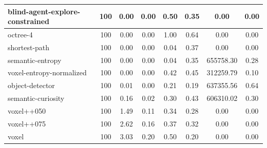 \begin{table}
\begin{longtable}{|l|c|c| c|c| c|c|c|}
        blind-agent-explore-constrained & 100 & {\cellcolor[HTML]{EBF2F0}} \color[HTML]{000000} 0.00 & {\cellcolor[HTML]{EBF2F0}} \color[HTML]{000000} 0.00 & {\cellcolor[HTML]{ACD4CC}} \color[HTML]{000000} 0.50 & 0.35 & 0.00 & 0.00 \\ \hline
        octree-4 & 100 & {\cellcolor[HTML]{EBF2F0}} \color[HTML]{000000} 0.00 & {\cellcolor[HTML]{EBF2F0}} \color[HTML]{000000} 0.00 & {\cellcolor[HTML]{55AA99}} \color[HTML]{F1F1F1} 1.00 & 0.64 & 0.00 & 0.00 \\ \hline
        shortest-path & 100 & {\cellcolor[HTML]{EBF2F0}} \color[HTML]{000000} 0.00 & {\cellcolor[HTML]{EBF2F0}} \color[HTML]{000000} 0.00 & {\cellcolor[HTML]{EBF2F0}} \color[HTML]{000000} 0.04 & 0.37 & 0.00 & 0.00 \\ \hline
        semantic-entropy & 100 & {\cellcolor[HTML]{EBF2F0}} \color[HTML]{000000} 0.00 & {\cellcolor[HTML]{EBF2F0}} \color[HTML]{000000} 0.00 & {\cellcolor[HTML]{EBF2F0}} \color[HTML]{000000} 0.04 & 0.35 & 655758.30 & 0.28 \\ \hline
        voxel-entropy-normalized & 100 & {\cellcolor[HTML]{EBF2F0}} \color[HTML]{000000} 0.00 & {\cellcolor[HTML]{EBF2F0}} \color[HTML]{000000} 0.00 & {\cellcolor[HTML]{BADBD4}} \color[HTML]{000000} 0.42 & 0.45 & 312259.79 & 0.10 \\ \hline
        object-detector & 100 & {\cellcolor[HTML]{EBF2F0}} \color[HTML]{000000} 0.01 & {\cellcolor[HTML]{EBF2F0}} \color[HTML]{000000} 0.00 & {\cellcolor[HTML]{E0EDEA}} \color[HTML]{000000} 0.21 & 0.19 & 637355.56 & 0.64 \\ \hline
        semantic-curiosity & 100 & {\cellcolor[HTML]{EBF2F0}} \color[HTML]{000000} 0.16 & {\cellcolor[HTML]{EBF2F0}} \color[HTML]{000000} 0.02 & {\cellcolor[HTML]{CFE5E0}} \color[HTML]{000000} 0.30 & 0.43 & 606310.02 & 0.30 \\ \hline
        voxel++050 & 100 & {\cellcolor[HTML]{D5E8E4}} \color[HTML]{000000} 1.49 & {\cellcolor[HTML]{EBF2F0}} \color[HTML]{000000} 0.11 & {\cellcolor[HTML]{C8E2DC}} \color[HTML]{000000} 0.34 & 0.28 & 0.00 & 0.00 \\ \hline
        voxel++075 & 100 & {\cellcolor[HTML]{C3DFD9}} \color[HTML]{000000} 2.62 & {\cellcolor[HTML]{D9EAE6}} \color[HTML]{000000} 0.16 & {\cellcolor[HTML]{C2DFD9}} \color[HTML]{000000} 0.37 & 0.32 & 0.00 & 0.00 \\ \hline
        voxel & 100 & {\cellcolor[HTML]{BDDCD5}} \color[HTML]{000000} 3.03 & {\cellcolor[HTML]{BADAD4}} \color[HTML]{000000} 0.20 & {\cellcolor[HTML]{ACD4CC}} \color[HTML]{000000} 0.50 & 0.20 & 0.00 & 0.00 \\ \hline

\end{longtable}
\end{table}
